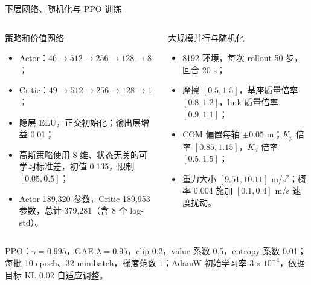 \documentclass[aspectratio=169,10pt]{beamer}
\begin{document}
\begin{frame}{下层网络、随机化与 PPO 训练}
\scriptsize
\begin{columns}[T,onlytextwidth]
\begin{block}{策略和价值网络}
\begin{itemize}
  \item Actor：$46\rightarrow512\rightarrow256\rightarrow128\rightarrow8$；
  \item Critic：$49\rightarrow512\rightarrow256\rightarrow128\rightarrow1$；
  \item 隐层 ELU，正交初始化；输出层增益 0.01；
  \item 高斯策略使用 8 维、状态无关的可学习标准差，初值 0.135，限制 $[0.05,0.5]$；
  \item Actor 189,320 参数，Critic 189,953 参数，总计 379,281（含 8 个 log-std）。
\end{itemize}
\end{block}
\begin{block}{大规模并行与随机化}
\begin{itemize}
  \item 8192 环境，每次 rollout 50 步，回合 20 s；
  \item 摩擦 $[0.5,1.5]$，基座质量倍率 $[0.8,1.2]$，link 质量倍率 $[0.9,1.1]$；
  \item COM 偏置每轴 $\pm0.05$ m；$K_p$ 倍率 $[0.85,1.15]$，$K_d$ 倍率 $[0.5,1.5]$；
  \item 重力大小 $[9.51,10.11]$ m/s$^2$；概率 0.004 施加 $[0.1,0.4]$ m/s 速度扰动。
\end{itemize}
\end{block}
\end{columns}
PPO：$\gamma=0.995$，GAE $\lambda=0.95$，clip 0.2，value 系数 0.5，entropy 系数 0.01；每批 10 epoch、32 minibatch，梯度范数 1；AdamW 初始学习率 $3\times10^{-4}$，依据目标 KL 0.02 自适应调整。
\end{frame}
\end{document}
